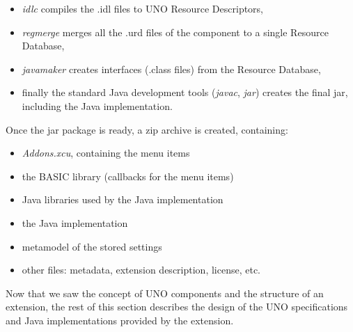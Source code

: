 \begin{itemize}
\item \emph{idlc} compiles the .idl files to UNO Resource Descriptors,
\item \emph{regmerge} merges all the .urd files of the component to a single Resource Database,
\item \emph{javamaker} creates interfaces (.class files) from the Resource Database,
\item finally the standard Java development tools (\emph{javac}, \emph{jar})
creates the final jar, including the Java implementation.
\end{itemize}

Once the jar package is ready, a zip archive is created, containing:

\begin{itemize}
\item \emph{Addons.xcu}, containing the menu items
\item the BASIC library (callbacks for the menu items)
\item Java libraries used by the Java implementation
\item the Java implementation
\item metamodel of the stored settings
\item other files: metadata, extension description, license, etc.
\end{itemize}

Now that we saw the concept of UNO components and the structure of an
extension, the rest of this section describes the design of the UNO
specifications and Java implementations provided by the extension.


